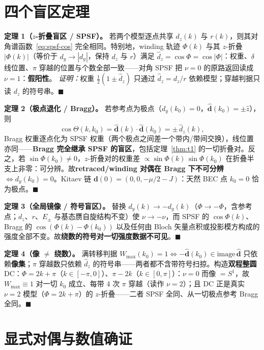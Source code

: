 \documentclass[onecolumn,aps,prl,superscriptaddress,longbibliography]{revtex4-2}
\begin{document}
\section{四个盲区定理}\label{sec:theorems}

\textbf{定理 1（$z$-折叠盲区 / SPSF）。}\label{thm:t1}
若两个模型逐点共享 $d_z(k)$ 与 $r(k)$，则其对角谱函数~\eqref{eq:spsf-cos} 完全相同。特别地，winding 轨迹 $\Phi(k)$ 与其 $z$-折叠 $|\Phi(k)|$（等价于 $d_y\to|d_y|$，保持 $d_z$ 与 $r$）满足 $\hat d_z=\cos\Phi=\cos|\Phi|$：权重、$\delta$ 线位置、$\pi$ 穿越的位置与个数全部一致——对角 SPSF 把 $\nu=0$ 的原路返回读成 $\nu=1$：\textbf{假阳性}。
\textit{证明：}权重 $\tfrac12(1\pm\hat d_z)$ 只通过 $\hat d_z=d_z/r$ 依赖模型；穿越判据只读 $d_z$ 的符号串。$\blacksquare$

\textbf{定理 2（极点退化 / Bragg）。}\label{thm:t2}
若参考点为极点（$d_y(k_0)=0$，$\hat{\mathbf{d}}(k_0)=\pm\hat z$），则
\begin{equation}\label{eq:pole-deg}
\cos\Theta(k,k_0) = \hat{\mathbf{d}}(k)\cdot\hat{\mathbf{d}}(k_0) = \pm\,\hat d_z(k),
\end{equation}
Bragg 权重逐点化为 SPSF 权重（两个极点之间差一个带内/带间交换），线位置亦同——\textbf{Bragg 完全继承 SPSF 的盲区}，包括定理~\ref{thm:t1} 的一切折叠对。反之，若 $\sin\Phi(k_0)\neq0$，$z$-折叠对的权重差 $\propto\sin\Phi(k)\,\sin\Phi(k_0)$ 在折叠半支上非零：可分辨。故\textbf{retraced/winding 对偶在 Bragg 下不可分辨 $\iff d_y(k_0)=0$}。Kitaev 链 $\mathbf{d}(0)=(0,0,-\mu/2-J)$：天然 BEC 点 $k_0=0$ 恰为极点。$\blacksquare$

\textbf{定理 3（全局镜像 / 符号盲区）。}\label{thm:t3}
替换 $d_y(k)\to-d_y(k)$（$\Phi\to-\Phi$，含参考点；$d_z$、$r$、$E_\pm$ 与基态赝自旋结构不变）使 $\nu\to-\nu$，而 SPSF 的 $\cos\Phi(k)$、Bragg 的 $\cos(\Phi(k)-\Phi(k_0))$ 以及任何由 Bloch 矢量点积或投影模方构成的强度全部不变。故\textbf{绕数的符号对一切强度数据不可见}。$\blacksquare$

\textbf{定理 4（像 $\neq$ 绕数）。}\label{thm:t4}
满转移判据 $W_{\max}(k_0)=1\iff-\hat{\mathbf{d}}(k_0)\in\mathrm{image}\,\hat{\mathbf{d}}$ 只依赖\textbf{像集}；$\pi$ 穿越数只依赖 $\hat d_z$ 的符号串——两者都不含带符号扫掠。构造\textbf{双程整圆} DC：$\Phi=2k+\pi$（$k\in[-\pi,0]$）、$\pi-2k$（$k\in[0,\pi]$）：$\nu=0$ 而像 $=S^1$，故 $W_{\max}\equiv1$ 对一切 $k_0$ 成立、每带 4 次 $\pi$ 穿越（读作 $\nu=2$）；且 DC 正是真实 $\nu=2$ 模型（$\Phi=2k+\pi$）的 $z$-折叠——二者 SPSF 全同、从一切极点参考 Bragg 全同。$\blacksquare$

\section{显式对偶与数值确证}\label{sec:numerics}
\end{document}
